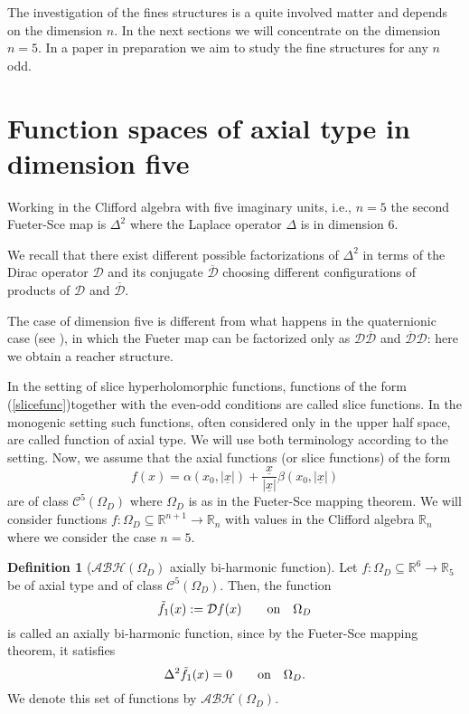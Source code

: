 \documentclass[reqno,11pt]{amsart}
\numberwithin{equation}{section}
\theoremstyle{definition}
\newtheorem{definition}[theorem]{Definition}
\begin{document}
\medskip

The investigation of the fines structures is a quite involved matter and depends on the dimension $n$.
In the next sections we will concentrate on the dimension $n=5$. In a paper in preparation we aim to study the fine structures for any $n$ odd.




\section{Function spaces of axial type in dimension five}\label{FACTRFIVE}


Working in the Clifford  algebra with five imaginary units, i.e., $n=5$
 the second Fueter-Sce map is $\Delta^2$ where the Laplace operator $\Delta$ is in dimension 6.

We recall that there exist different possible factorizations of
 $\Delta^2$ in terms of the Dirac operator $ \mathcal{D}$ and its conjugate $ \mathcal{\overline{D}}$ choosing different configurations  of products of
 $\mathcal{D}$ and $ \mathcal{\overline{D}}$.

The case of dimension five is different from what happens in the quaternionic case (see \cite{CDPS,CDPS1}), in which the Fueter map can be factorized only as $ \mathcal{D} \mathcal{\overline{D}}$ and $ \mathcal{\overline{D}} \mathcal{D}$: here we obtain a reacher structure.

\medskip
In the setting of slice hyperholomorphic functions, functions of the form
 (\ref{slicefunc})together with the even-odd conditions are called slice functions.
 In the monogenic setting such functions, often considered only in the upper half space, are called
 function of axial type. We will use both terminology according to the setting.
Now, we assume that the axial functions (or slice functions) of the form
$$
f(x)=\alpha(x_0, | \underline{x}|)+ \frac{\underline{x}}{| \underline{x}|} \beta(x_0, |\underline{x}|)
$$
 are of class $\mathcal{C}^5(\Omega_D)$ where $\Omega_D$ is as in the Fueter-Sce mapping theorem.
 We will consider functions $f: \Omega_D \subseteq \mathbb{R}^{n+1}\to \mathbb{R}_n$
with values in the Clifford algebra $\mathbb{R}_n$ where we consider the case $n=5$.
\begin{definition}[$\mathcal{ABH}(\Omega_D)$ axially bi-harmonic function]
Let $f: \Omega_D \subseteq \mathbb{R}^{6}\to \mathbb{R}_5$ be of axial type and of class $\mathcal{C}^5(\Omega_D)$.
Then, the function
$$
\tilde{f}_1(x):= \mathcal{D}f(x) \qquad \hbox{on} \quad \Omega_D
$$
is called  an axially bi-harmonic function, since by the Fueter-Sce mapping theorem, it satisfies
$$
\Delta^2 \tilde{f}_1(x)=0 \qquad \hbox{on} \quad \Omega_D.
$$
We denote this set of functions by $ \mathcal{ABH}(\Omega_D)$.
\end{definition}
\end{document}
